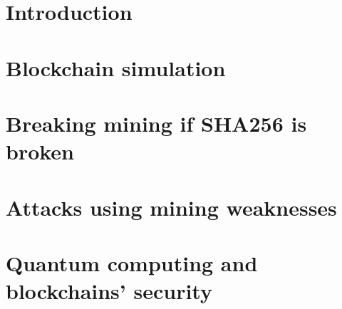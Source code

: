 \documentclass[a4paper,twoside,10pt]{report}
\begin{document}

\thispagestyle{empty}

\tableofcontents %
\thispagestyle{empty}
\clearpage



\chapter{Introduction}
\setcounter{page}{1}

  

  

  

  

\chapter{Blockchain simulation}

  

\chapter{Breaking mining if SHA256 is broken}

	

  

  

  

  

\chapter{Attacks using mining weaknesses}

  

  

\chapter{Quantum computing and blockchains' security}

  

  

  

\appendix



\nocite{*}


\end{document}
